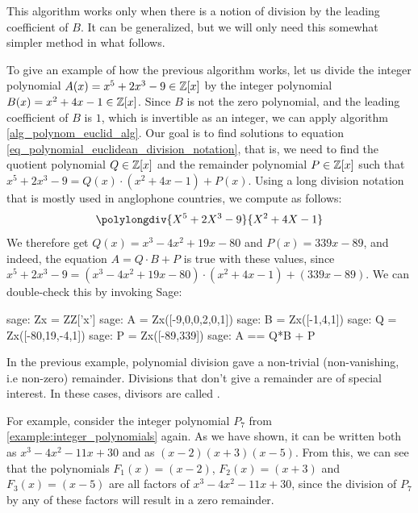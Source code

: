 This algorithm works only when there is a notion of division by the leading coefficient of $B$. It can be generalized, but we will only need this somewhat simpler method in what follows.
\begin{example} To give an example of how the previous algorithm works, let us divide the integer polynomial $A(x)=x^5+2x^3-9\in \mathbb{Z}[x]$ by the integer polynomial $B(x)=x^2+4x-1\in\mathbb{Z}[x]$. Since $B$ is not the zero polynomial, and the leading coefficient of $B$ is $1$, which is invertible as an integer, we can apply algorithm \ref{alg_polynom_euclid_alg}. Our goal is to find solutions to equation \ref{eq_polynomial_euclidean_division_notation}, that is, we need to find the quotient polynomial $Q\in\mathbb{Z}[x]$ and the remainder polynomial $P \in \mathbb{Z}[x]$ such that $x^5+2x^3-9 = Q(x)\cdot (x^2+4x-1) + P(x)$. Using a long division notation that is mostly used in anglophone countries, we compute as follows:
\begin{equation}
\polylongdiv{X^5+2X^3-9}{X^2+4X-1}
\end{equation}
We therefore get $Q(x)=x^3-4x^2+19x-80$ and $P(x)=339x-89$, and indeed, the equation $ A=  Q \cdot B + P$ is true with these values, since $x^5+2x^3-9 = (x^3-4x^2+19x-80)\cdot (x^2+4x-1) + (339x-89)$. We can double-check this by invoking Sage:
\begin{sagecommandline}
sage: Zx = ZZ['x']
sage: A = Zx([-9,0,0,2,0,1])
sage: B = Zx([-1,4,1])
sage: Q = Zx([-80,19,-4,1])
sage: P = Zx([-89,339])
sage: A == Q*B + P
\end{sagecommandline}
\end{example}
\begin{example} In the previous example, polynomial division gave a non-trivial (non-vanishing, i.e non-zero) remainder. Divisions that don't give a remainder are of special interest. In these cases, divisors are called .

For example, consider the integer polynomial $P_7$ from \examplename{} \ref{example:integer_polynomials} again. As we have shown, it can be written both as $x^3 - 4 x^2 - 11 x + 30$ and as $(x-2)(x + 3)(x-5)$. From this, we can see that the polynomials $F_1(x)=(x-2)$, $F_2(x)=(x+3)$ and $F_3(x)=(x-5)$ are all factors of $x^3 - 4 x^2 - 11 x + 30$, since the division of $P_7$ by any of these factors will result in a zero remainder.
\end{example}
